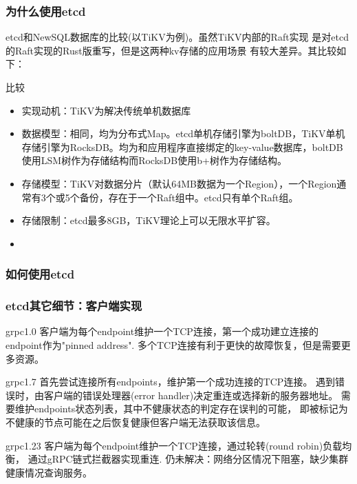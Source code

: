 \documentclass{beamer}
\begin{document}
%
%
\begin{frame}
\frametitle{为什么使用etcd}

etcd和NewSQL数据库的比较(以TiKV为例)。虽然TiKV内部的Raft实现
是对etcd的Raft实现的Rust版重写，但是这两种kv存储的应用场景
有较大差异。其比较如下：

\begin{alertblock}{比较}
    \begin{itemize}
        \item 实现动机：TiKV为解决传统单机数据库
        \item 数据模型：相同，均为分布式Map。etcd单机存储引擎为boltDB，TiKV单机存储引擎为RocksDB。均为和应用程序直接绑定的key-value数据库，boltDB使用LSM树作为存储结构而RocksDB使用b+树作为存储结构。
        \item 存储模型：TiKV对数据分片（默认64MB数据为一个Region），一个Region通常有3个或5个备份，存在于一个Raft组中。etcd只有单个Raft组。
        \item 存储限制：etcd最多8GB，TiKV理论上可以无限水平扩容。
        \item 
    \end{itemize}
\end{alertblock}

\end{frame}


\begin{frame}
\frametitle{如何使用etcd}
\end{frame}

%
%
\begin{frame}
\frametitle{etcd其它细节：客户端实现}

\begin{block}{grpc1.0}
客户端为每个endpoint维护一个TCP连接，第一个成功建立连接的endpoint作为"pinned address". 
多个TCP连接有利于更快的故障恢复，但是需要更多资源。
\end{block}

\begin{block}{grpc1.7}
首先尝试连接所有endpoints，维护第一个成功连接的TCP连接。
遇到错误时，由客户端的错误处理器(error handler)决定重连或选择新的服务器地址。
需要维护endpoints状态列表，其中不健康状态的判定存在误判的可能，
即被标记为不健康的节点可能在之后恢复健康但客户端无法获取该信息。
\end{block}

\begin{block}{grpc1.23}
客户端为每个endpoint维护一个TCP连接，通过轮转(round robin)负载均衡，
通过gRPC链式拦截器实现重连.
\alert{仍未解决：}网络分区情况下阻塞，缺少集群健康情况查询服务。
\end{block}

\end{frame}
\end{document}
